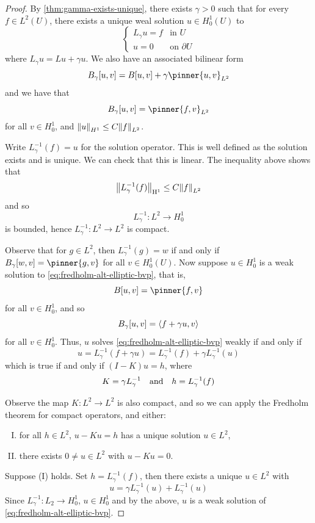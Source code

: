 \documentclass{article}
\begin{document}
\begin{proof}
    By \cref{thm:gamma-exists-unique}, there exists \(\gamma > 0\) such that for every \(f \in L^2(U)\), there exists a unique weal solution \(u \in H_0^1(U)\) to
    \[\begin{cases}
        L_\gamma u = f &\text{in }U \\
        u = 0 &\text{on }\partial U
    \end{cases}\]
    where \(L_\gamma u =L u + \gamma u\). We also have an associated bilinear form
    \[B_\gamma[u, v] = B[u, v] + \gamma\pinner{u, v}_{L^2}\]
    and we have that
    \[B_\gamma[u, v] = \pinner{f,v}_{L^2}\]
    for all \(v \in H^1_0\), and \(\norm{u}_{H^1} \le C\norm{f}_{L^2}\).

    Write \(L_\gamma^{-1}(f) = u\) for the solution operator. This is well defined as the solution exists and is unique. We can check that this is linear. The inequality above shows that
    \[\norm{L_\gamma^{-1}(f)}_{\mathrm{H}^1} \le C\norm{f}_{L^2}\]
    and so
    \[L_\gamma^{-1} : L^2 \to H_0^1\]
    is bounded, hence \(L_\gamma^{-1} : L^2 \to L^2\) is compact.

    Observe that for \(g \in L^2\), then \(L_\gamma^{-1}(g) = w\) if and only if \(B_\gamma[w, v] = \pinner{g, v}\) for all \(v \in H_0^1(U)\). Now suppose \(u \in H_0^1\) is a weak solution to \cref{eq:fredholm-alt-elliptic-bvp}, that is,
    \[B[u, v] = \pinner{f, v}\]
    for all \(v \in H_0^1\), and so
    \[B_\gamma[u, v] = \left\langle f + \gamma u, v \right\rangle\]
    for all \(v \in H_0^1\). Thus, \(u\) solves \cref{eq:fredholm-alt-elliptic-bvp} weakly if and only if
    \[u = L_\gamma^{-1}(f + \gamma u) = L_\gamma^{-1}(f) + \gamma L_\gamma^{-1}(u)\]
    which is true if and only if \((I - K)u = h\), where
    \[K = \gamma L_\gamma^{-1} \qqtext{and} h = L_\gamma^{-1}(f)\]
\lec

Observe the map \(K : L^2 \to L^2\) is also compact, and so we can apply the Fredholm theorem for compact operators, and either:
\begin{enumerate}[(I)]
    \item for all \(h \in L^2\), \(u - Ku = h\) has a unique solution \(u \in L^2\),
    \item there exists \(0 \ne u \in L^2\) with \(u - Ku = 0\).
\end{enumerate}
Suppose (I) holds. Set \(h = L_\gamma^{-1}(f)\), then there exists a unique \(u \in L^2\) with
\[u = \gamma L_\gamma^{-1}(u) + L_\gamma^{-1}(u)\]
Since \(L_\gamma^{-1} : L_2 \to H_0^1\), \(u \in H_0^1\) and by the above, \(u\) is a weak solution of \cref{eq:fredholm-alt-elliptic-bvp}.


\end{proof}
\end{document}
